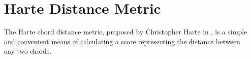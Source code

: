 \section{Harte Distance Metric}

The Harte chord distance metric, proposed by Christopher Harte in \cite{harte2010towards}, is a simple and convenient means of calculating a score representing the distance between any two chords.
